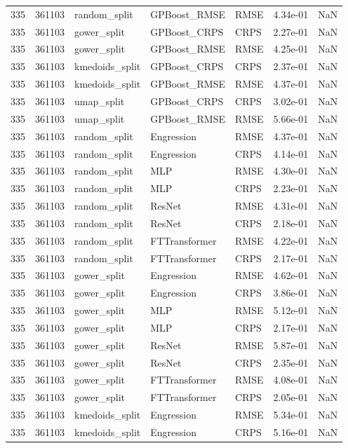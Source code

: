 \begin{tabular}{rrlllrr}
335 & 361103 & random\_split & GPBoost\_RMSE & RMSE & 4.34e-01 & NaN \\
335 & 361103 & gower\_split & GPBoost\_CRPS & CRPS & 2.27e-01 & NaN \\
335 & 361103 & gower\_split & GPBoost\_RMSE & RMSE & 4.25e-01 & NaN \\
335 & 361103 & kmedoids\_split & GPBoost\_CRPS & CRPS & 2.37e-01 & NaN \\
335 & 361103 & kmedoids\_split & GPBoost\_RMSE & RMSE & 4.37e-01 & NaN \\
335 & 361103 & umap\_split & GPBoost\_CRPS & CRPS & 3.02e-01 & NaN \\
335 & 361103 & umap\_split & GPBoost\_RMSE & RMSE & 5.66e-01 & NaN \\
335 & 361103 & random\_split & Engression & RMSE & 4.37e-01 & NaN \\
335 & 361103 & random\_split & Engression & CRPS & 4.14e-01 & NaN \\
335 & 361103 & random\_split & MLP & RMSE & 4.30e-01 & NaN \\
335 & 361103 & random\_split & MLP & CRPS & 2.23e-01 & NaN \\
335 & 361103 & random\_split & ResNet & RMSE & 4.31e-01 & NaN \\
335 & 361103 & random\_split & ResNet & CRPS & 2.18e-01 & NaN \\
335 & 361103 & random\_split & FTTransformer & RMSE & 4.22e-01 & NaN \\
335 & 361103 & random\_split & FTTransformer & CRPS & 2.17e-01 & NaN \\
335 & 361103 & gower\_split & Engression & RMSE & 4.62e-01 & NaN \\
335 & 361103 & gower\_split & Engression & CRPS & 3.86e-01 & NaN \\
335 & 361103 & gower\_split & MLP & RMSE & 5.12e-01 & NaN \\
335 & 361103 & gower\_split & MLP & CRPS & 2.17e-01 & NaN \\
335 & 361103 & gower\_split & ResNet & RMSE & 5.87e-01 & NaN \\
335 & 361103 & gower\_split & ResNet & CRPS & 2.35e-01 & NaN \\
335 & 361103 & gower\_split & FTTransformer & RMSE & 4.08e-01 & NaN \\
335 & 361103 & gower\_split & FTTransformer & CRPS & 2.05e-01 & NaN \\
335 & 361103 & kmedoids\_split & Engression & RMSE & 5.34e-01 & NaN \\
335 & 361103 & kmedoids\_split & Engression & CRPS & 5.16e-01 & NaN \\

\end{tabular}
